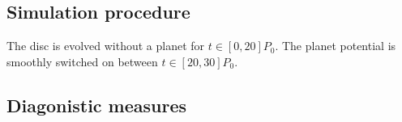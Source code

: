 
\subsection{Simulation procedure}
The disc is evolved without a planet for $t\in[0,20]P_0$. The planet potential is smoothly switched on
between $t\in[20,30]P_0$.



\subsection{Diagonistic measures}
